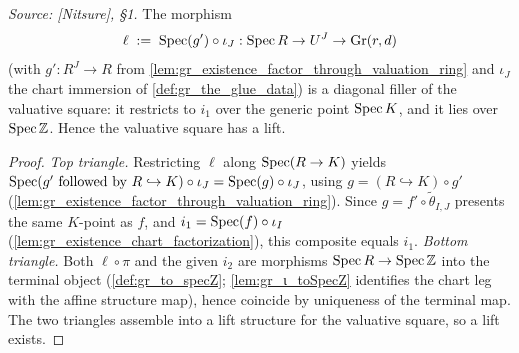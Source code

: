 \begin{lemma}\leanok
  \label{lem:gr_existence_lift}
  \textit{Source: [Nitsure], \S 1.}
  The morphism
  \[
    \ell \;:=\; \operatorname{Spec}(g') \circ \iota_J : \operatorname{Spec} R \to U^J \to \mathrm{Gr}(r,d)
  \]
  (with \(g' : R^J \to R\) from
  \cref{lem:gr_existence_factor_through_valuation_ring} and \(\iota_J\) the chart
  immersion of \cref{def:gr_the_glue_data}) is a diagonal filler of the valuative
  square: it restricts to \(i_1\) over the generic point \(\operatorname{Spec} K\), and it lies
  over \(\operatorname{Spec} \mathbb{Z}\). Hence the valuative square has a lift.
\end{lemma}
\begin{proof}
    \leanok
  \emph{Top triangle.} Restricting \(\ell\) along \(\operatorname{Spec}(R \to K)\) yields
  \(\operatorname{Spec}(g' \text{ followed by } R \hookrightarrow K) \circ \iota_J = \operatorname{Spec}(g)
  \circ \iota_J\), using \(g = (R \hookrightarrow K)\circ g'\)
  (\cref{lem:gr_existence_factor_through_valuation_ring}). Since \(g = f' \circ
  \tilde\theta_{I,J}\) presents the same \(K\)-point as \(f\), and \(i_1 = \operatorname{Spec}(f)
  \circ \iota_I\) (\cref{lem:gr_existence_chart_factorization}), this composite
  equals \(i_1\). \emph{Bottom triangle.} Both \(\ell \circ \pi\) and the given
  \(i_2\) are morphisms \(\operatorname{Spec} R \to \operatorname{Spec} \mathbb{Z}\) into the terminal object
  (\cref{def:gr_to_specZ}; \cref{lem:gr_ι_toSpecZ} identifies the chart leg with the
  affine structure map), hence coincide by uniqueness of the terminal map. The two
  triangles assemble into a lift structure for the valuative square, so a lift
  exists.
\end{proof}

